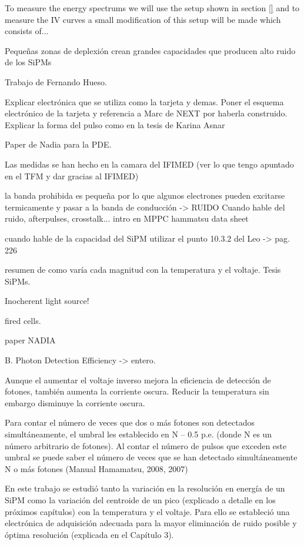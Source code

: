 To measure the energy spectrums we will use the setup shown in section \ref{} and to measure the IV curves a small modification of this setup will be made which consists of... 




Pequeñas zonas de deplexión crean grandes capacidades que producen alto ruido de los SiPMs

Trabajo de Fernando Hueso.

Explicar electrónica que se utiliza como la tarjeta y demas. Poner el esquema electrónico de la tarjeta y referencia a Marc de NEXT por haberla construido. Explicar la forma del pulso como en la tesis de Karina Asnar

Paper de Nadia para la PDE.

Las medidas se han hecho en la camara del IFIMED (ver lo que tengo apuntado en el TFM y dar gracias al IFIMED)

la banda prohibida es pequeña por lo que algunos electrones pueden excitarse termicamente y pasar a la banda de conducción -> RUIDO
Cuando hable del ruido, afterpulses, crosstalk... intro en MPPC hammatsu data sheet

cuando hable de la capacidad del SiPM utilizar el punto 10.3.2 del Leo -> pag. 226

resumen de como varía cada magnitud con la temperatura y el voltaje. Tesis SiPMs.

Inocherent light source!

fired cells.


paper NADIA

B. Photon Detection Efficiency -> entero.

Aunque el aumentar el voltaje inverso mejora la eficiencia de detección de fotones, también aumenta la corriente oscura. Reducir la temperatura sin embargo disminuye la corriente oscura.

Para contar el número de veces que dos o más fotones son detectados simultáneamente, el umbral les establecido en N – 0.5 p.e. (donde N es un número arbitrario de fotones). Al contar el número de pulsos que exceden este umbral se puede saber el número de veces que se han detectado simultáneamente N o más fotones (Manual Hamamatsu, 2008, 2007)

En este trabajo se estudió tanto la variación en la resolución en energía de un SiPM como la variación del centroide de un pico (explicado a detalle en los próximos capítulos) con la temperatura y el voltaje. Para ello se estableció una electrónica de adquisición adecuada para la mayor eliminación de ruido posible y óptima resolución (explicada en el Capítulo 3).


